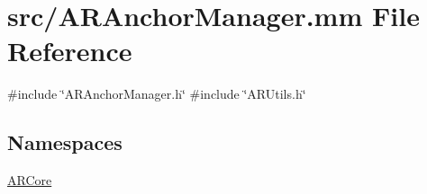 \hypertarget{_a_r_anchor_manager_8mm}{}\section{src/\+A\+R\+Anchor\+Manager.mm File Reference}
\label{_a_r_anchor_manager_8mm}
{\ttfamily \#include \char`\"{}A\+R\+Anchor\+Manager.\+h\char`\"{}}\newline
{\ttfamily \#include \char`\"{}A\+R\+Utils.\+h\char`\"{}}\newline
\subsection*{Namespaces}
\begin{DoxyCompactItemize}
\item 
 \mbox{\hyperlink{namespace_a_r_core}{A\+R\+Core}}
\end{DoxyCompactItemize}
